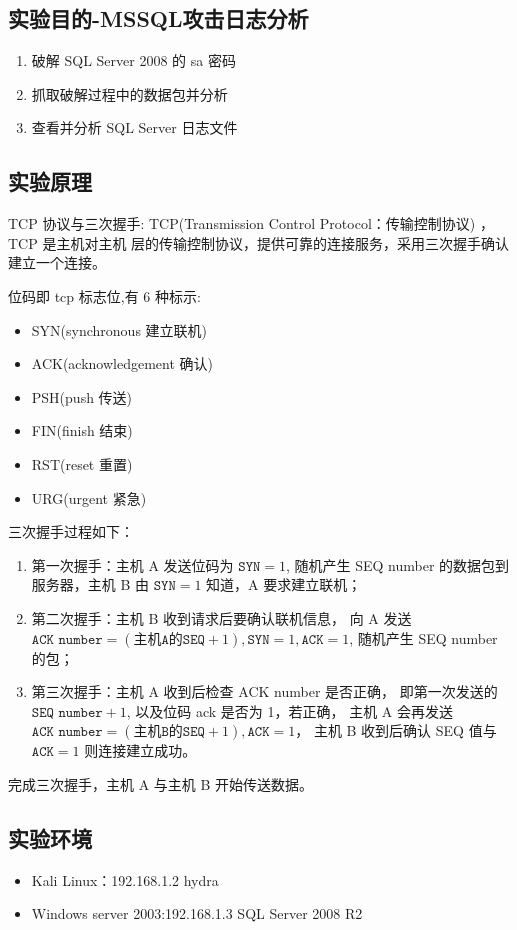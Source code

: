 \subsection{实验目的-MSSQL攻击日志分析}
\begin{enumerate}
  \item 破解 SQL Server 2008 的 sa 密码
  \item 抓取破解过程中的数据包并分析
  \item 查看并分析 SQL Server 日志文件
\end{enumerate}
%
\subsection{实验原理}
TCP 协议与三次握手:
TCP(Transmission Control Protocol：传输控制协议) ，TCP 是主机对主机
层的传输控制协议，提供可靠的连接服务，采用三次握手确认建立一个连接。

位码即 tcp 标志位,有 6 种标示:
\begin{itemize}
  \item SYN(synchronous 建立联机)
  \item ACK(acknowledgement 确认)
  \item PSH(push 传送)
  \item FIN(finish 结束)
  \item RST(reset 重置)
  \item URG(urgent 紧急)
\end{itemize}
%
三次握手过程如下：
\begin{enumerate}
  \item 第一次握手：主机 A 发送位码为 $\texttt{SYN}=1$, 随机产生 SEQ number 的数据包到
    服务器，主机 B 由 $\texttt{SYN}=1$ 知道，A 要求建立联机；
  \item 第二次握手：主机 B 收到请求后要确认联机信息，
    向 A 发送 $\texttt{ACK number}=(\texttt{主机A的SEQ}+1),\texttt{SYN}=1,\texttt{ACK}=1$,
    随机产生 SEQ number 的包；
  \item 第三次握手：主机 A 收到后检查 ACK number 是否正确，
    即第一次发送的 $\texttt{SEQ number}+1$,
    以及位码 ack 是否为 1，若正确，
    主机 A 会再发送 $\texttt{ACK number}=(\texttt{主机B的SEQ}+1),\texttt{ACK}=1$，
    主机 B 收到后确认 SEQ 值与 $\texttt{ACK}=1$ 则连接建立成功。
\end{enumerate}
完成三次握手，主机 A 与主机 B 开始传送数据。
%
\subsection{实验环境}
\begin{itemize}
  \item Kali Linux：192.168.1.2 hydra
  \item Windows server 2003:192.168.1.3 SQL Server 2008 R2
\end{itemize}
%
